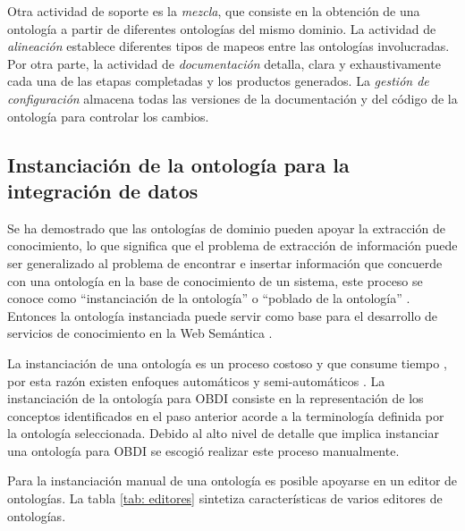 Otra actividad de soporte es la \textit{mezcla}, que consiste en la obtención de una ontología a partir de diferentes ontologías del mismo dominio. La actividad de \textit{alineación} establece diferentes tipos de mapeos entre las ontologías  involucradas. Por otra parte, la actividad de \textit{documentación} detalla, clara y exhaustivamente cada una de las etapas completadas y los productos generados. La \textit{gestión de configuración} almacena todas las versiones de la documentación y del código de la ontología para controlar los cambios.

\subsection{Instanciación de la ontología para la integración de datos}

Se ha demostrado que las ontologías de dominio pueden apoyar la extracción de conocimiento, lo que significa que el problema de extracción de información puede ser generalizado al problema de encontrar e insertar información que concuerde con una ontología en la base de conocimiento de un sistema, este proceso se conoce como ``instanciación de la ontología'' o ``poblado de la ontología'' \citep{JANNACH2009136}. Entonces la ontología instanciada puede servir como base para el desarrollo de servicios de conocimiento en la Web Semántica \citep{1179189}.

La instanciación de una ontología es un proceso costoso y que consume tiempo \citep{10.1007/978-0-387-87685-6_30}, por esta razón existen enfoques automáticos \citep{1179189,JANNACH2009136} y semi-automáticos \citep{10.1007/978-0-387-87685-6_30}. La instanciación de la ontología para OBDI consiste en la representación de los conceptos identificados en el paso anterior acorde a la terminología definida por la ontología seleccionada. Debido al alto nivel de detalle que implica instanciar una ontología para OBDI se escogió realizar este proceso manualmente. 

Para la instanciación manual de una ontología es posible apoyarse en un editor de ontologías. La tabla \ref{tab: editores} sintetiza características de varios editores de ontologías.

